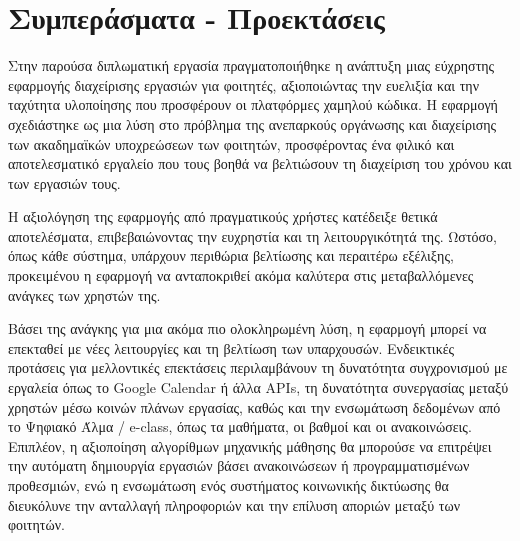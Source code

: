 \chapter{Συμπεράσματα - Προεκτάσεις}
    Στην παρούσα διπλωματική εργασία πραγματοποιήθηκε η ανάπτυξη μιας εύχρηστης εφαρμογής διαχείρισης εργασιών για φοιτητές, αξιοποιώντας την ευελιξία και την ταχύτητα υλοποίησης που προσφέρουν οι πλατφόρμες χαμηλού κώδικα. Η εφαρμογή σχεδιάστηκε ως μια λύση στο πρόβλημα της ανεπαρκούς οργάνωσης και διαχείρισης των ακαδημαϊκών υποχρεώσεων των φοιτητών, προσφέροντας ένα φιλικό και αποτελεσματικό εργαλείο που τους βοηθά να βελτιώσουν τη διαχείριση του χρόνου και των εργασιών τους.

    Η αξιολόγηση της εφαρμογής από πραγματικούς χρήστες κατέδειξε θετικά αποτελέσματα, επιβεβαιώνοντας την ευχρηστία και τη λειτουργικότητά της. Ωστόσο, όπως κάθε σύστημα, υπάρχουν περιθώρια βελτίωσης και περαιτέρω εξέλιξης, προκειμένου η εφαρμογή να ανταποκριθεί ακόμα καλύτερα στις μεταβαλλόμενες ανάγκες των χρηστών της.

    Βάσει της ανάγκης για μια ακόμα πιο ολοκληρωμένη λύση, η εφαρμογή μπορεί να επεκταθεί με νέες λειτουργίες και τη βελτίωση των υπαρχουσών. Ενδεικτικές προτάσεις για μελλοντικές επεκτάσεις περιλαμβάνουν τη δυνατότητα συγχρονισμού με εργαλεία όπως το Google Calendar ή άλλα APIs, τη δυνατότητα συνεργασίας μεταξύ χρηστών μέσω κοινών πλάνων εργασίας, καθώς και την ενσωμάτωση δεδομένων από το Ψηφιακό Άλμα / e-class, όπως τα μαθήματα, οι βαθμοί και οι ανακοινώσεις. Επιπλέον, η αξιοποίηση αλγορίθμων μηχανικής μάθησης θα μπορούσε να επιτρέψει την αυτόματη δημιουργία εργασιών βάσει ανακοινώσεων ή προγραμματισμένων προθεσμιών, ενώ η ενσωμάτωση ενός συστήματος κοινωνικής δικτύωσης θα διευκόλυνε την ανταλλαγή πληροφοριών και την επίλυση αποριών μεταξύ των φοιτητών.
